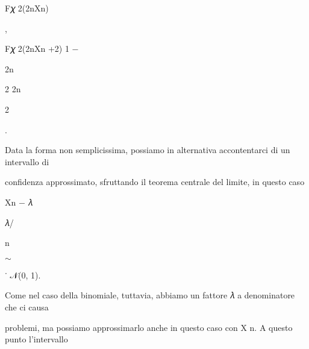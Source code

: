 \documentclass[a4paper,portrait,12pt]{article}
\begin{document}
\begin{flushleft}
F𝜒 2(2nXn)
\end{flushleft}


,


\begin{flushleft}
F𝜒 2(2nXn +2) 1 $-$
\end{flushleft}


\begin{flushleft}
2n
\end{flushleft}


\begin{flushleft}
2 2n
\end{flushleft}


2





.





\begin{flushleft}
Data la forma non semplicissima, possiamo in alternativa accontentarci di un intervallo di
\end{flushleft}


\begin{flushleft}
confidenza approssimato, sfruttando il teorema centrale del limite, in questo caso
\end{flushleft}


\begin{flushleft}
Xn $-$ 𝜆
\end{flushleft}


\begin{flushleft}
𝜆/
\end{flushleft}


\begin{flushleft}
n
\end{flushleft}





$\sim$


\begin{flushleft}
˙ 𝒩(0, 1).
\end{flushleft}





\begin{flushleft}
Come nel caso della binomiale, tuttavia, abbiamo un fattore 𝜆 a denominatore che ci causa
\end{flushleft}


\begin{flushleft}
problemi, ma possiamo approssimarlo anche in questo caso con X n. A questo punto l'intervallo
\end{flushleft}
\end{document}
